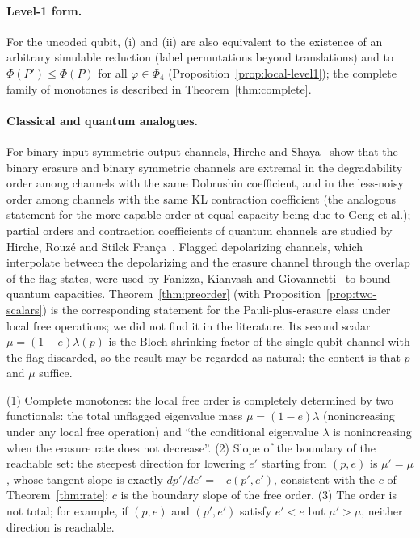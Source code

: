 \paragraph{Level-1 form.}
For the uncoded qubit, (i) and (ii) are also equivalent to the existence of an arbitrary simulable reduction (label permutations beyond translations) and to $\Phi(P')\le\Phi(P)$ for all $\varphi\in\Phi_4$ (Proposition~\ref{prop:local-level1}); the complete family of monotones is described in Theorem~\ref{thm:complete}.

\paragraph{Classical and quantum analogues.}
For binary-input symmetric-output channels, Hirche and Shaya~\cite{HircheShaya} show that the binary erasure and binary symmetric channels are extremal in the degradability order among channels with the same Dobrushin coefficient, and in the less-noisy order among channels with the same KL contraction coefficient (the analogous statement for the more-capable order at equal capacity being due to Geng et al.); partial orders and contraction coefficients of quantum channels are studied by Hirche, Rouz\'e and Stilck Fran\c{c}a~\cite{HRSF}.
Flagged depolarizing channels, which interpolate between the depolarizing and the erasure channel through the overlap of the flag states, were used by Fanizza, Kianvash and Giovannetti~\cite{FKG} to bound quantum capacities.
Theorem~\ref{thm:preorder} (with Proposition~\ref{prop:two-scalars}) is the corresponding statement for the Pauli-plus-erasure class under local free operations; we did not find it in the literature. Its second scalar $\mu=(1-e)\lambda(p)$ is the Bloch shrinking factor of the single-qubit channel with the flag discarded, so the result may be regarded as natural; the content is that $p$ and $\mu$ suffice.

\begin{remark}[Structure]
(1) Complete monotones: the local free order is completely determined by two functionals: the total unflagged eigenvalue mass $\mu=(1-e)\lambda$ (nonincreasing under any local free operation)
and ``the conditional eigenvalue $\lambda$ is nonincreasing when the erasure rate does not decrease''.
(2) Slope of the boundary of the reachable set: the steepest direction for lowering $e'$ starting from $(p,e)$ is $\mu'=\mu$, whose tangent slope is exactly
$dp'/de'=-c(p',e')$, consistent with the $c$ of Theorem~\ref{thm:rate}: $c$ is the boundary slope of the free order.
(3) The order is not total; for example, if $(p,e)$ and $(p',e')$ satisfy $e'<e$ but $\mu'>\mu$, neither direction is reachable.
\end{remark}

